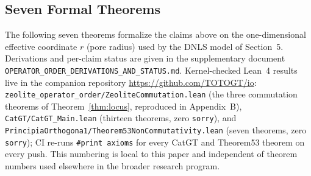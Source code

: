 \documentclass[11pt]{article}
\begin{document}
\subsection{Seven Formal Theorems}
\label{sec:theorems}

The following seven theorems formalize the claims above on the one-dimensional effective coordinate $r$ (pore radius) used by the DNLS model of Section~5. Derivations and per-claim status are given in the supplementary document \texttt{OPERATOR\_ORDER\_DERIVATIONS\_AND\_STATUS.md}. Kernel-checked Lean~4 results live in the companion repository \url{https://github.com/TOTOGT/io}: \texttt{zeolite\_operator\_order/ZeoliteCommutation.lean} (the three commutation theorems of Theorem~\ref{thm:locus}, reproduced in Appendix~B), \texttt{CatGT/CatGT\_Main.lean} (thirteen theorems, zero \texttt{sorry}), and \texttt{PrincipiaOrthogona1/Theorem53NonCommutativity.lean} (seven theorems, zero \texttt{sorry}); CI re-runs \texttt{\#print axioms} for every CatGT and Theorem53 theorem on every push. This numbering is local to this paper and independent of theorem numbers used elsewhere in the broader research program.
\end{document}
